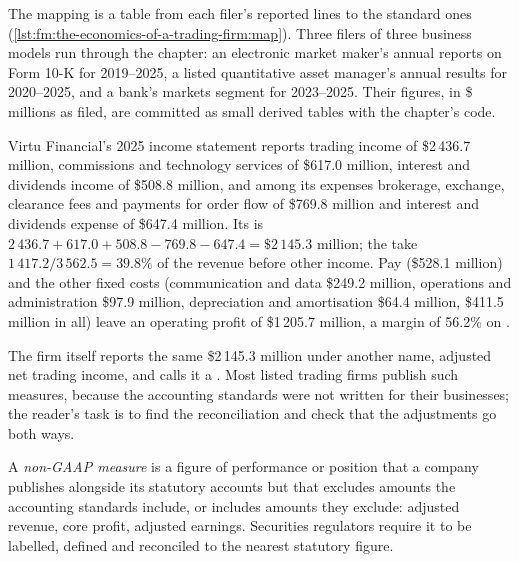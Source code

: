 The mapping is a table from each filer's reported lines to the standard ones (\cref{lst:fm:the-economics-of-a-trading-firm:map}). Three filers of
three business models run through the chapter: an electronic market maker's annual reports on Form 10-K for 2019--2025, a listed quantitative asset
manager's annual results for 2020--2025, and a bank's markets segment for 2023--2025. Their figures, in \$ millions as filed, are committed as small
derived tables with the chapter's code.

\label{lst:fm:the-economics-of-a-trading-firm:map}

\begin{example}\label{ex:fm:the-economics-of-a-trading-firm:virtu}
Virtu Financial's 2025 income statement reports trading income of \$2\,436.7 million, commissions and technology services of \$617.0 million,
interest and dividends income of \$508.8 million, and among its expenses brokerage, exchange, clearance fees and payments for order flow of
\$769.8 million and interest and dividends expense of \$647.4 million. Its  is $2\,436.7+617.0+508.8-769.8-647.4=\$2\,145.3$
million; the  take $1\,417.2/3\,562.5=39.8\%$ of the revenue before other income. Pay (\$528.1 million) and the other fixed
costs (communication and data \$249.2 million, operations and administration \$97.9 million, depreciation and amortisation \$64.4 million, \$411.5
million in all) leave an operating profit of \$1\,205.7 million, a margin of 56.2\% on .
\end{example}

The firm itself reports the same \$2\,145.3 million under another name, adjusted net trading income, and calls it a . Most listed
trading firms publish such measures, because the accounting standards were not written for their businesses; the reader's task is to find the
reconciliation and check that the adjustments go both ways.

\begin{definition}\label{def:fm:the-economics-of-a-trading-firm:nongaap}
A \emph{non-GAAP measure} is a figure of performance or position that a company publishes alongside its statutory
accounts but that excludes amounts the accounting standards include, or includes amounts they exclude: adjusted revenue, core profit, adjusted
earnings. Securities regulators require it to be labelled, defined and reconciled to the nearest statutory figure.
\end{definition}

